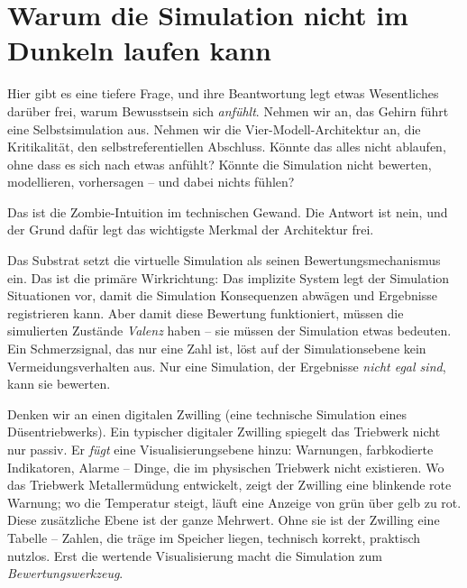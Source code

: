 \documentclass[11pt, twoside, openright]{book}
\begin{document}
\section*{Warum die Simulation nicht im Dunkeln laufen kann}

Hier gibt es eine tiefere Frage, und ihre Beantwortung legt etwas Wesentliches darüber frei, warum Bewusstsein sich \textit{anfühlt}. Nehmen wir an, das Gehirn führt eine Selbstsimulation aus. Nehmen wir die Vier-Modell-Architektur an, die Kritikalität, den selbstreferentiellen Abschluss. Könnte das alles nicht ablaufen, ohne dass es sich nach etwas anfühlt? Könnte die Simulation nicht bewerten, modellieren, vorhersagen -- und dabei nichts fühlen?

Das ist die Zombie-Intuition im technischen Gewand. Die Antwort ist nein, und der Grund dafür legt das wichtigste Merkmal der Architektur frei.

Das Substrat setzt die virtuelle Simulation als seinen Bewertungsmechanismus ein. Das ist die primäre Wirkrichtung: Das implizite System legt der Simulation Situationen vor, damit die Simulation Konsequenzen abwägen und Ergebnisse registrieren kann. Aber damit diese Bewertung funktioniert, müssen die simulierten Zustände \textit{Valenz} haben -- sie müssen der Simulation etwas bedeuten. Ein Schmerzsignal, das nur eine Zahl ist, löst auf der Simulationsebene kein Vermeidungsverhalten aus. Nur eine Simulation, der Ergebnisse \textit{nicht egal sind}, kann sie bewerten.

Denken wir an einen digitalen Zwilling (eine technische Simulation eines Düsentriebwerks). Ein typischer digitaler Zwilling spiegelt das Triebwerk nicht nur passiv. Er \textit{fügt} eine Visualisierungsebene hinzu: Warnungen, farbkodierte Indikatoren, Alarme -- Dinge, die im physischen Triebwerk nicht existieren. Wo das Triebwerk Metallermüdung entwickelt, zeigt der Zwilling eine blinkende rote Warnung; wo die Temperatur steigt, läuft eine Anzeige von grün über gelb zu rot. Diese zusätzliche Ebene ist der ganze Mehrwert. Ohne sie ist der Zwilling eine Tabelle -- Zahlen, die träge im Speicher liegen, technisch korrekt, praktisch nutzlos. Erst die wertende Visualisierung macht die Simulation zum \textit{Bewertungswerkzeug}.
\end{document}
